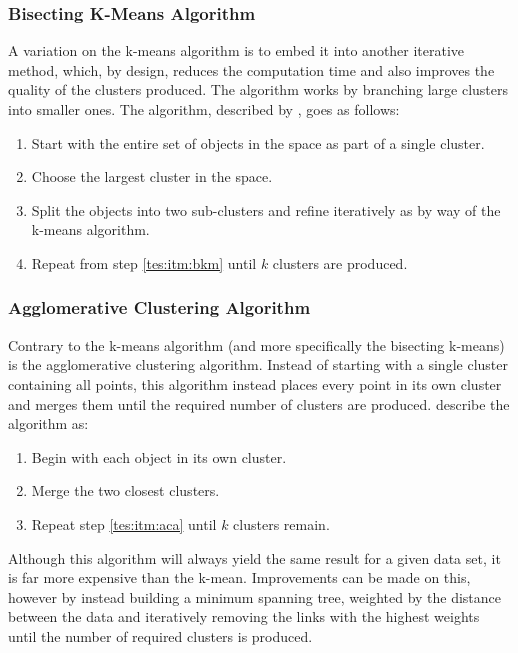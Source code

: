 \subsubsection{Bisecting K-Means Algorithm}\label{tes:ssec:bkma}
A variation on the k-means algorithm is to embed it into another iterative method, which, by design, reduces the computation time and also improves the quality of the clusters produced. The algorithm works by branching large clusters into smaller ones. The algorithm, described by \citet{steinbach2000comparison}, goes as follows:
\begin{enumerate}
  \item Start with the entire set of objects in the space as part of a single cluster.
  \item\label{tes:itm:bkm} Choose the largest cluster in the space.
  \item Split the objects into two sub-clusters and refine iteratively as by way of the k-means algorithm.
  \item Repeat from step \ref{tes:itm:bkm} until $k$ clusters are produced.
\end{enumerate}
%
\subsubsection{Agglomerative Clustering Algorithm}
Contrary to the k-means algorithm (and more specifically the bisecting k-means) is the agglomerative clustering algorithm. Instead of starting with a single cluster containing all points, this algorithm instead places every point in its own cluster and merges them until the required number of clusters are produced. \citet{way2012advances} describe the algorithm as:
\begin{enumerate}
  \item Begin with each object in its own cluster.
  \item\label{tes:itm:aca} Merge the two closest clusters.
  \item Repeat step \ref{tes:itm:aca} until $k$ clusters remain.
\end{enumerate}
Although this algorithm will always yield the same result for a given data set, it is far more expensive than the k-mean. Improvements can be made on this, however by instead building a minimum spanning tree, weighted by the distance between the data and iteratively removing the links with the highest weights until the number of required clusters is produced.
